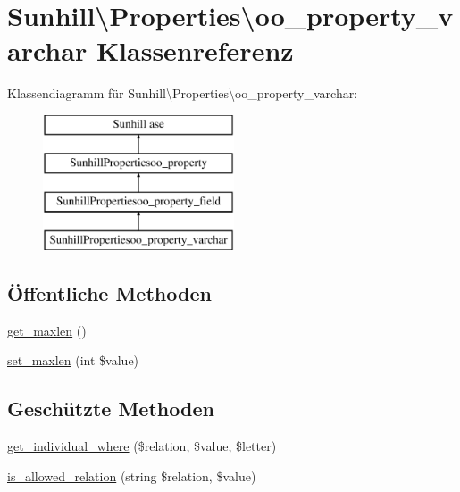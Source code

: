 \hypertarget{classSunhill_1_1Properties_1_1oo__property__varchar}{}\section{Sunhill\textbackslash{}Properties\textbackslash{}oo\+\_\+property\+\_\+varchar Klassenreferenz}
\label{classSunhill_1_1Properties_1_1oo__property__varchar}
Klassendiagramm für Sunhill\textbackslash{}Properties\textbackslash{}oo\+\_\+property\+\_\+varchar\+:\begin{figure}[H]
\begin{center}
\leavevmode
\includegraphics[height=4.000000cm]{d0/d41/classSunhill_1_1Properties_1_1oo__property__varchar}
\end{center}
\end{figure}
\subsection*{Öffentliche Methoden}
\begin{DoxyCompactItemize}
\item 
\hyperlink{classSunhill_1_1Properties_1_1oo__property__varchar_a596f5e65a1d3e8f3b72768ebb6048c9d}{get\+\_\+maxlen} ()
\item 
\hyperlink{classSunhill_1_1Properties_1_1oo__property__varchar_a0f78aba8a39ca2e99cc83d3c0622fdac}{set\+\_\+maxlen} (int \$value)
\end{DoxyCompactItemize}
\subsection*{Geschützte Methoden}
\begin{DoxyCompactItemize}
\item 
\hyperlink{classSunhill_1_1Properties_1_1oo__property__varchar_aadc6b3ed28c801c37d838b0a3b2005a5}{get\+\_\+individual\+\_\+where} (\$relation, \$value, \$letter)
\item 
\hyperlink{classSunhill_1_1Properties_1_1oo__property__varchar_a969a02e16fe6d8a0916e62f2731c00ef}{is\+\_\+allowed\+\_\+relation} (string \$relation, \$value)
\end{DoxyCompactItemize}
